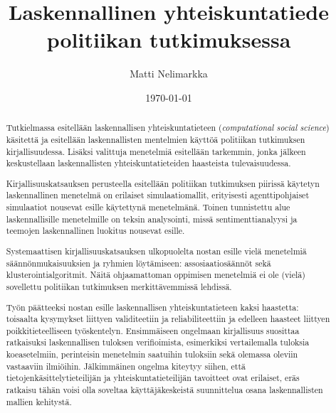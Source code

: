 \documentclass[finnish,gradu,twoside,12pt]{tktltiki}
\begin{document}

\title{Laskennallinen yhteiskuntatiede politiikan tutkimuksessa}
\author{Matti Nelimarkka}
\date{\today}

\numberofpagesinformation{}


\maketitle

\begin{abstract}
Tutkielmassa esitellään laskennallisen yhteiskuntatieteen (\textit{computational social science}) käsitettä ja esitellään laskennallisten mentelmien käyttöä politiikan tutkimuksen kirjallisuudessa. Lisäksi valittuja menetelmiä esitellään tarkemmin, jonka jälkeen keskustellaan laskennallisten yhteiskuntatieteiden haasteista tulevaisuudessa.

Kirjallisuuskatsauksen perusteella esitellään politiikan tutkimuksen piirissä käytetyn laskennallinen menetelmä on erilaiset simulaatiomallit, erityisesti agenttipohjaiset simulaatiot nousevat esille käytettynä menetelmänä. Toinen tunnistettu alue laskennallisille menetelmille on teksin analysointi, missä sentimenttianalyysi ja teemojen laskennallinen luokitus nousevat esille.

Systemaattisen kirjallisuuskatsauksen ulkopuolelta nostan esille vielä menetelmiä säännönmukaisuuksien ja ryhmien löytämiseen: assosiaatiosäännöt sekä klusterointialgoritmit. Näitä ohjaamattoman oppimisen menetelmiä ei ole (vielä) sovellettu politiikan tutkimuksen merkittävemmissä lehdissä.

Työn päätteeksi nostan esille laskennallisen yhteiskuntatieteen kaksi haastetta: toisaalta kysymykset liittyen validiteetiin ja reliabiliteettiin ja edelleen haasteet liittyen poikkitieteelliseen työskentelyn. Ensimmäiseen ongelmaan kirjallisuus suosittaa ratkaisuksi laskennallisen tuloksen verifioimista, esimerkiksi vertailemalla tuloksia koeasetelmiin, perinteisin menetelmin saatuihin tuloksiin sekä olemassa oleviin vastaaviin ilmiöihin. Jälkimmäinen ongelma kiteytyy siihen, että tietojenkäsittelytieteilijän ja yhteiskuntatieteilijän tavoitteet ovat erilaiset, eräs ratkaisu tähän voisi olla soveltaa käyttäjäkeskeistä suunnittelua osana laskennallisten mallien kehitystä.
\end{abstract}
\end{document}
